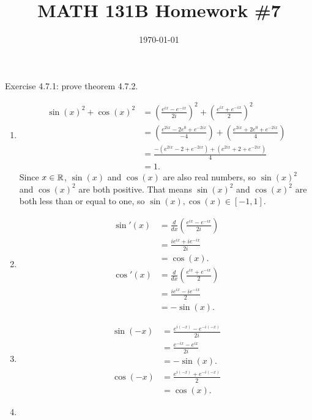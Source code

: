 \documentclass{article}
\date{\today}
\title{MATH 131B Homework \#7}
\begin{document}
\maketitle

\begin{prob}
    Exercise 4.7.1: prove theorem 4.7.2.
\end{prob}
\begin{enumerate}[label=(\alph*)]
    \item \begin{align*}
            \sin(x)^2+\cos(x)^2 &= \left( \frac{e^{ix}-e^{-ix}}{2i} \right)^2 + \left( \frac{e^{ix}+e^{-ix}}{2} \right)^2 \\
                                &= \left( \frac{e^{2ix}-2e^0+e^{-2ix}}{-4} \right) + \left( \frac{e^{2ix}+2e^0+e^{-2ix}}{4} \right) \\
                                &= \frac{-(e^{2ix}-2+e^{-2ix})+(e^{2ix}+2+e^{-2ix})}{4} \\
                                &= 1.
    \end{align*}
    Since $x \in \mathbb{R}$, $\sin(x)$ and $\cos(x)$ are also real numbers, so $\sin(x)^2$ and $\cos(x)^2$ are both positive. That means $\sin(x)^2$ and $\cos(x)^2$ are both less than or equal to one, so $\sin(x), \cos(x) \in [-1, 1]$.
\item \begin{align*}
        \sin'(x) &= \frac{d}{dx} \left( \frac{e^{ix}-e^{-ix}}{2i} \right) \\
                 &= \frac{ie^{ix}+ie^{-ix}}{2i} \\
                 &= \cos(x). \\
        \cos'(x) &= \frac{d}{dx} \left( \frac{e^{ix}+e^{-ix}}{2} \right) \\
                 &= \frac{ie^{ix}-ie^{-ix}}{2} \\
                 &= - \sin(x).
\end{align*}
\item \begin{align*}
        \sin(-x) &= \frac{e^{i(-x)}-e^{-i(-x)}}{2i} \\
                 &= \frac{e^{-ix}-e^{ix}}{2i} \\
                 &= - \sin(x). \\
        \cos(-x) &= \frac{e^{i(-x)}+e^{-i(-x)}}{2} \\
                 &= \cos(x).
\end{align*}
\item \begin{align*}

\end{align*}
\end{enumerate}
\end{document}
